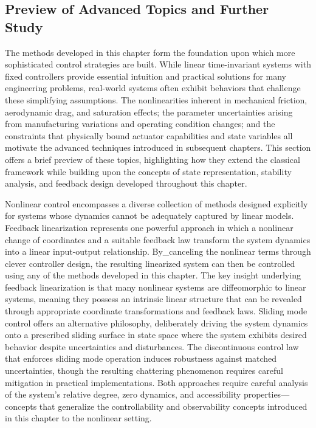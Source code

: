 \subsection{Preview of Advanced Topics and Further Study}

The methods developed in this chapter form the foundation upon which more sophisticated control strategies are built. While linear time-invariant systems with fixed controllers provide essential intuition and practical solutions for many engineering problems, real-world systems often exhibit behaviors that challenge these simplifying assumptions. The nonlinearities inherent in mechanical friction, aerodynamic drag, and saturation effects; the parameter uncertainties arising from manufacturing variations and operating condition changes; and the constraints that physically bound actuator capabilities and state variables all motivate the advanced techniques introduced in subsequent chapters. This section offers a brief preview of these topics, highlighting how they extend the classical framework while building upon the concepts of state representation, stability analysis, and feedback design developed throughout this chapter.

Nonlinear control encompasses a diverse collection of methods designed explicitly for systems whose dynamics cannot be adequately captured by linear models. Feedback linearization represents one powerful approach in which a nonlinear change of coordinates and a suitable feedback law transform the system dynamics into a linear input-output relationship. By_canceling the nonlinear terms through clever controller design, the resulting linearized system can then be controlled using any of the methods developed in this chapter. The key insight underlying feedback linearization is that many nonlinear systems are diffeomorphic to linear systems, meaning they possess an intrinsic linear structure that can be revealed through appropriate coordinate transformations and feedback laws. Sliding mode control offers an alternative philosophy, deliberately driving the system dynamics onto a prescribed sliding surface in state space where the system exhibits desired behavior despite uncertainties and disturbances. The discontinuous control law that enforces sliding mode operation induces robustness against matched uncertainties, though the resulting chattering phenomenon requires careful mitigation in practical implementations. Both approaches require careful analysis of the system's relative degree, zero dynamics, and accessibility properties—concepts that generalize the controllability and observability concepts introduced in this chapter to the nonlinear setting.

